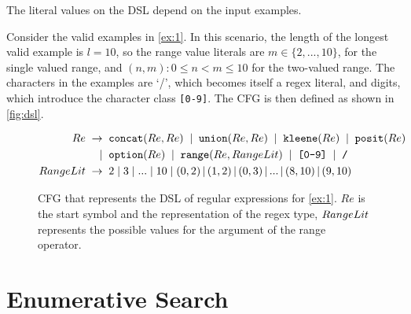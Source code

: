 \begin{example}\label{ex:dsl}
The literal values on the DSL depend on the input examples.

%
Consider the valid examples in \autoref{ex:1}.
%
In this scenario, the length of the longest valid example is \(l = 10\), so the range value literals are \(m \in \{2, ..., 10\}\), for the single valued range, and \((n, m): 0 \leq n < m \leq 10\) for the two-valued range. The characters in the examples are `/', which becomes itself a regex literal, and digits, which introduce the character class \texttt{[0-9]}. The \ac{CFG} is then defined as shown in \autoref{fig:dsl}.
%
\end{example}
\begin{figure}[t]
  \begin{align*}
    Re \;\to \;\;&  \texttt{concat}(Re, Re) \;\;|\;\;  \texttt{union}(Re, Re)   \;\;|\;\;  \texttt{kleene}(Re) \;\;|\;\;  \texttt{posit}(Re) \\
          |\;\;&  \texttt{option}(Re) \;\;|\;\;  \texttt{range}(Re, RangeLit) \;\;|\;\; \texttt{[0-9]} \;\;|\;\; \texttt{/}\\
    RangeLit \;\to \;\;&  2 \;|\; 3 \;|\; ... \;|\; 10 \;|\; (0,2) \,|\, (1,2)\,|\, (0,3) \,|\, ... \,|\, (8,10)\,|\, (9,10)
  \end{align*}
  \captionsetup{belowskip=-7pt, aboveskip=-5pt}
  \caption{\ac{CFG} that represents the \ac{DSL} of regular expressions for \autoref{ex:1}. \(Re\) is the start symbol and the representation of the regex type, \(RangeLit{}\) represents the possible values for the argument of the range operator.}
  \label{fig:dsl}
\end{figure}



\section{Enumerative Search}\label{sec:enumeration}

